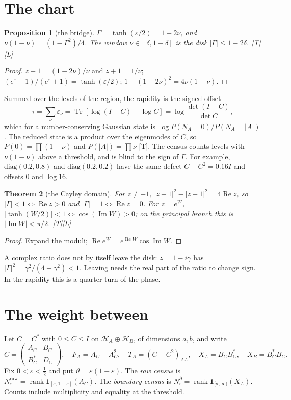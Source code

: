 \documentclass[11pt]{article}
\newtheorem{theorem}{Theorem}[section]
\newtheorem{proposition}[theorem]{Proposition}
\theoremstyle{definition}
\newcommand{\grade}[1]{\textsf{\small[#1]}}
\newcommand{\Tr}{\operatorname{Tr}}
\newcommand{\Rea}{\operatorname{Re}}
\newcommand{\Ima}{\operatorname{Im}}
\newcommand{\rank}{\operatorname{rank}}
\begin{document}
\section{The chart}\label{sec:chart}
\begin{proposition}[the bridge]\label{prop:bridge}
$\Gamma=\tanh(\varepsilon/2)=1-2\nu$, and $\nu(1-\nu)=(1-\Gamma^2)/4$. The window $\nu\in[\delta,1-\delta]$ is the disk $|\Gamma|\le1-2\delta$. \grade{T}\grade{L}
\end{proposition}
\begin{proof}
$z-1=(1-2\nu)/\nu$ and $z+1=1/\nu$; $(e^\varepsilon-1)/(e^\varepsilon+1)=\tanh(\varepsilon/2)$; $1-(1-2\nu)^2=4\nu(1-\nu)$.
\end{proof}
Summed over the levels of the region, the rapidity is the signed offset
\begin{equation}\label{eq:offset}
\tau=\sum_\nu\varepsilon_\nu=\Tr[\log(I-C)-\log C]=\log\frac{\det(I-C)}{\det C},
\end{equation}
which for a number-conserving Gaussian state is $\log P(N_A=0)/P(N_A=|A|)$. The reduced state is a product over the eigenmodes of $C$, so $P(0)=\prod(1-\nu)$ and $P(|A|)=\prod\nu$ \grade{T}. The census counts levels with $\nu(1-\nu)$ above a threshold, and is blind to the sign of $\Gamma$. For example, $\mathrm{diag}(0.2,0.8)$ and $\mathrm{diag}(0.2,0.2)$ have the same defect $C-C^2=0.16I$ and offsets $0$ and $\log16$.

\begin{theorem}[the Cayley domain]\label{thm:cayley}
For $z\ne-1$, $|z+1|^2-|z-1|^2=4\Rea z$, so $|\Gamma|<1\iff\Rea z>0$ and $|\Gamma|=1\iff\Rea z=0$. For $z=e^W$, $|\tanh(W/2)|<1\iff\cos(\Ima W)>0$; on the principal branch this is $|\Ima W|<\pi/2$. \grade{T}\grade{L}
\end{theorem}
\begin{proof}
Expand the moduli; $\Rea e^W=e^{\Rea W}\cos\Ima W$.
\end{proof}
A complex ratio does not by itself leave the disk: $z=1-i\gamma$ has $|\Gamma|^2=\gamma^2/(4+\gamma^2)<1$. Leaving needs the real part of the ratio to change sign. In the rapidity this is a quarter turn of the phase.

\section{The weight between}\label{sec:weight}
Let $C=C^*$ with $0\le C\le I$ on $\mathcal H_A\oplus\mathcal H_B$, of dimensions $a,b$, and write
\[
C=\begin{pmatrix}A_C&B_C\\B_C^*&D_C\end{pmatrix},\quad F_A=A_C-A_C^2,\quad T_A=(C-C^2)_{AA},\quad X_A=B_CB_C^*,\quad X_B=B_C^*B_C.
\]
Fix $0<\varepsilon<\tfrac12$ and put $\vartheta=\varepsilon(1-\varepsilon)$. The \emph{raw census} is $N^{\mathrm{raw}}_\varepsilon=\rank\mathbf 1_{[\varepsilon,1-\varepsilon]}(A_C)$. The \emph{boundary census} is $N^\partial_\varepsilon=\rank\mathbf 1_{[\vartheta,\infty)}(X_A)$. Counts include multiplicity and equality at the threshold.
\end{document}
